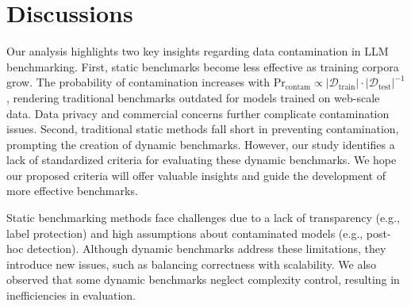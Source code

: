 \section{Discussions}
\label{sec:discussion}
Our analysis highlights two key insights regarding data contamination in LLM benchmarking. First, static benchmarks become less effective as training corpora grow. The probability of contamination increases with \(\text{Pr}_{\text{contam}} \propto |\mathcal{D}_{\text{train}}| \cdot |\mathcal{D}_{\text{test}}|^{-1}\), rendering traditional benchmarks outdated for models trained on web-scale data. Data privacy and commercial concerns further complicate contamination issues.  
Second, traditional static methods fall short in preventing contamination, prompting the creation of dynamic benchmarks. However, our study identifies a lack of standardized criteria for evaluating these dynamic benchmarks. We hope our proposed criteria will offer valuable insights and guide the development of more effective benchmarks.

Static benchmarking methods face challenges due to a lack of transparency (e.g., label protection) and high assumptions about contaminated models (e.g., post-hoc detection). Although dynamic benchmarks address these limitations, they introduce new issues, such as balancing correctness with scalability. We also observed that some dynamic benchmarks neglect complexity control, resulting in inefficiencies in evaluation.


